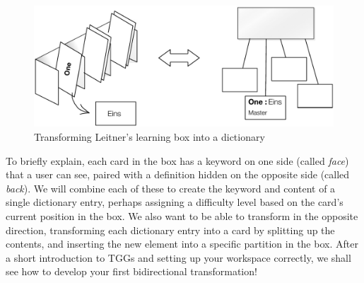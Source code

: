 \begin{figure}[htbp]
\begin{center}
  \includegraphics[width=\textwidth]{TGGTransformationExample.pdf}
  \caption{Transforming Leitner's learning box into a dictionary}
  \label{fig:transformIdea}
\end{center}
\end{figure}

To briefly explain, each card in the box has a keyword on one side (called \emph{face}) that a user can see, paired with a definition hidden on the opposite side (called \emph{back}). 
We will combine each of these to create the keyword and content of a single dictionary entry, perhaps assigning a difficulty level based on the card's current position in the box. 
We also want to be able to transform in the opposite direction, transforming each dictionary entry into a card by splitting up the contents, and inserting the new element into a specific partition in the box. 
After a short introduction to TGGs and setting up your workspace correctly, we shall see how to develop
your first bidirectional transformation!


